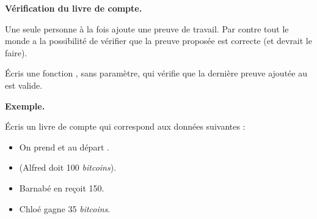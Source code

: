 \documentclass[12pt,class=report,crop=false]{standalone}
\begin{document}
\begin{enumerate}
 \newpage

 \textbf{Vérification du livre de compte.}  
   
Une seule personne à la fois ajoute une preuve de travail. Par contre tout le monde a la possibilité de vérifier que la preuve proposée est correcte (et devrait le faire). 


	Écris une fonction , sans paramètre, qui vérifie que la dernière preuve ajoutée au  est valide.
	
	
	\bigskip
	

\textbf{Exemple.}

Écris un livre de compte qui correspond aux données suivantes :
	\begin{itemize}
	  \item On prend  et au départ .
	  \item {} (Alfred doit 100 \emph{bitcoins}).
	  \item Barnabé en reçoit 150.
	  \item Chloé gagne 35 \emph{bitcoins}.
	\end{itemize}

\end{enumerate} 
\end{document}
